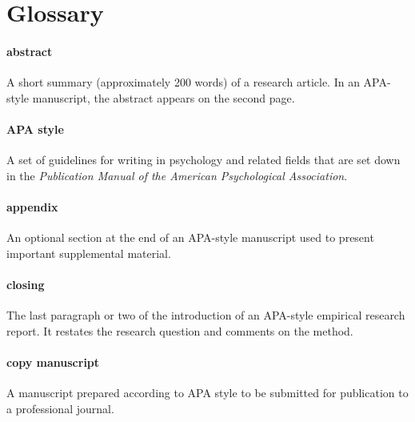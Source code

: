\documentclass[
]{krantz}
\begin{document}
\hypertarget{glossary-11}{%
\section{Glossary}\label{glossary-11}}

\hypertarget{abstract}{%
\paragraph*{abstract}\label{abstract}}

A short summary (approximately 200 words) of a research article. In an APA-style manuscript, the abstract appears on the second page.

\hypertarget{apa-style}{%
\paragraph*{APA style}\label{apa-style}}

A set of guidelines for writing in psychology and related fields that are set down in the \emph{Publication Manual of the American Psychological Association}.

\hypertarget{appendix}{%
\paragraph*{appendix}\label{appendix}}

An optional section at the end of an APA-style manuscript used to present important supplemental material.

\hypertarget{closing}{%
\paragraph*{closing}\label{closing}}

The last paragraph or two of the introduction of an APA-style empirical research report. It restates the research question and comments on the method.

\hypertarget{copy-manuscript}{%
\paragraph*{copy manuscript}\label{copy-manuscript}}

A manuscript prepared according to APA style to be submitted for publication to a professional journal.
\end{document}
